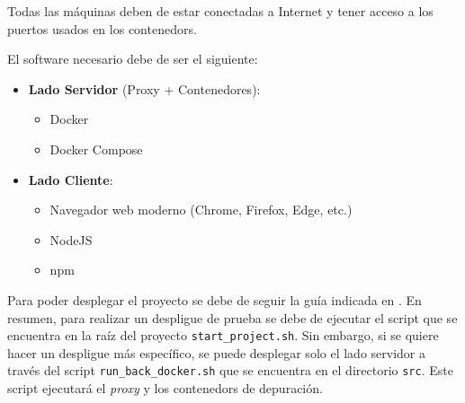 Todas las máquinas deben de estar conectadas a Internet y tener acceso a los puertos usados en los \glspl{contenedor}.

El software necesario debe de ser el siguiente:
\begin{itemize}
    \item \textbf{Lado Servidor} (Proxy + Contenedores):
    \begin{itemize}
        \item Docker
        \item Docker Compose
    \end{itemize}
    \item \textbf{Lado Cliente}:
    \begin{itemize}
        \item Navegador web moderno (Chrome, Firefox, Edge, etc.)
        \item NodeJS
        \item npm
    \end{itemize}   
\end{itemize}

Para poder desplegar el proyecto se debe de seguir la guía indicada en .
En resumen, para realizar un despligue de prueba se debe de ejecutar el script que se encuentra en la raíz del proyecto \texttt{start\_project.sh}. Sin embargo, si se quiere hacer un despligue más específico, se puede desplegar solo el lado servidor a través del script \texttt{run\_back\_docker.sh} que se encuentra en el directorio \texttt{src}. Este script ejecutará el \textit{\gls{proxy}} y los \glspl{contenedor} de depuración.